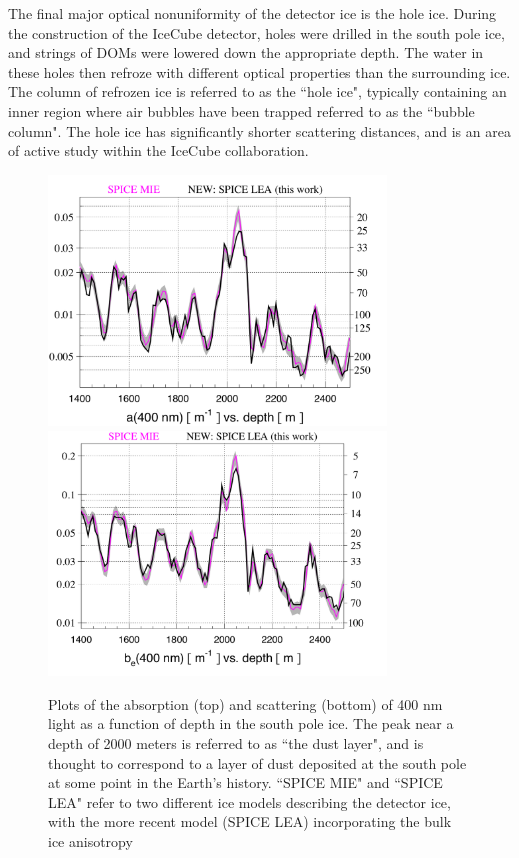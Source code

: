 The final major optical nonuniformity of the detector ice is the hole ice. During the construction of the IceCube detector, holes were drilled in the south pole ice, and strings of DOMs were lowered down the appropriate depth. The water in these holes then refroze with different optical properties than the surrounding ice. The column of refrozen ice is referred to as the ``hole ice", typically containing an inner region where air bubbles have been trapped referred to as the ``bubble column". The hole ice has significantly shorter scattering distances, and is an area of active study within the IceCube collaboration. 

\begin{figure}[h]
\centering
\includegraphics[width=0.8\textwidth]{figs/icedepth1.png}
\includegraphics[width=0.8\textwidth]{figs/icedepth2.png}
\caption{Plots of the absorption (top) and scattering (bottom) of 400 nm light as a function of depth in the south pole ice. The peak near a depth of 2000 meters is referred to as ``the dust layer", and is thought to correspond to a layer of dust deposited at the south pole at some point in the Earth's history. ``SPICE MIE" and ``SPICE LEA" refer to two different ice models describing the detector ice, with the more recent model (SPICE LEA) incorporating the bulk ice anisotropy~\cite{iceproceedings} }
\label{fig:icedepth}
\end{figure}


